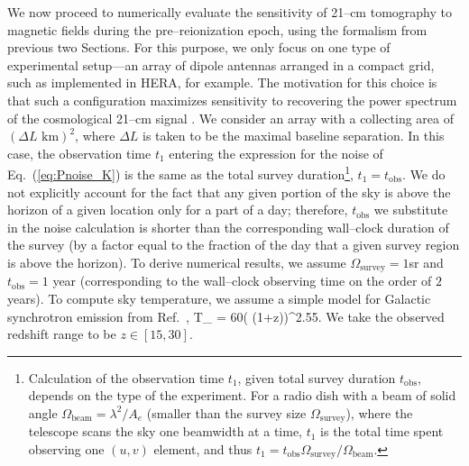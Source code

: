 We now proceed to numerically evaluate the sensitivity of 21--cm tomography to magnetic fields during the pre--reionization epoch, using the formalism from previous two Sections. For this purpose, we only focus on one type of experimental setup---an array of dipole antennas arranged in a compact grid, such as implemented in HERA, for example. The motivation for this choice is that such a configuration maximizes sensitivity to recovering the power spectrum of the cosmological 21--cm signal \cite{2009PhRvD..79h3530T,2015AAS...22532803D}. We consider an array with a collecting area of $(\Delta L\text{ km})^2$, where $\Delta L$ is taken to be the maximal baseline separation. In this case, the observation time $t_1$ entering the expression for the noise of Eq.~(\ref{eq:Pnoise_K}) is the same as the total survey duration\footnote{Calculation of the observation time $t_1$, given total survey duration $t_\text{obs}$, depends on the type of the experiment. For a radio dish with a beam of solid angle $\Omega_\text{beam}=\lambda^2/A_e$ (smaller than the survey size $\Omega_\text{survey}$), where the telescope scans the sky one beamwidth at a time, $t_1$ is the total time spent observing one $(u,v)$ element, and thus $t_1=t_\text{obs}\Omega_\text{survey}/\Omega_\text{beam}$.}, $t_1=t_\text{obs}$. We do not explicitly account for the fact that any given portion of the sky is above the horizon of a given location only for a part of a day; therefore, $t_\text{obs}$ we substitute in the noise calculation is shorter than the corresponding wall--clock duration of the survey (by a factor equal to the fraction of the day that a given survey region is above the horizon). To derive numerical results, we assume $\Omega_\text{survey}=1$sr and $t_\text{obs}=1$ year (corresponding to the wall--clock observing time on the order of $2$ years). To compute sky temperature, we assume a simple model for Galactic synchrotron emission from Ref.~\cite{2008PhRvD..78b3529M}, 
\beq
T_  = 60\left( (1+z)\right)^{2.55}\text{   [K]}.
\label{eq:tsys}
\eeq
We take the observed redshift range to be $z\in[15,30]$. 

